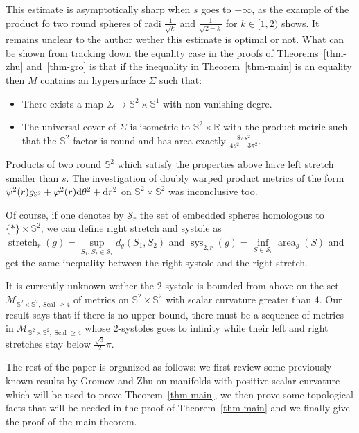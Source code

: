 \documentclass[10pt,a4paper]{amsart}
\numberwithin{equation}{section}
\DeclareMathOperator{\scal}{Scal}
\DeclareMathOperator{\aire}{area}
\DeclareMathOperator{\sys}{sys}
\DeclareMathOperator{\str}{stretch}
\newcommand{\ph}{\varphi}
\begin{document}
\begin{rem}
 This estimate is asymptotically sharp when $s$ goes to $+\infty$, as
 the example of the product fo two round spheres of radi
 $\frac{1}{\sqrt{k}}$ and $\frac{1}{\sqrt{2-k}}$ for $k\in[1,2)$
 shows. It remains unclear to the author wether this estimate is optimal or not. What can be shown from
 tracking down the equality case in the proofs of Theorems~\ref{thm-zhu} and~\ref{thm-gro} is that if the inequality in Theorem~\ref{thm-main} is an equality then $M$ contains an hypersurface
 $\Sigma$ such that:
 \begin{itemize}\itemsep=0pt
 \item There exists a map $\Sigma\to\mathbb{S}^2\times\mathbb{S}^1$
 with non-vanishing degre.
 \item The universal cover of $\Sigma$ is isometric to $\mathbb{S}^2\times\mathbb{R}$ with the product metric such that
 the $\mathbb{S}^2$ factor is round and has area exactly $\frac{8\pi s^2}{4s^2-3\pi^2}$.
 \end{itemize}
 Products of two round $\mathbb{S}^2$ which satisfy the properties
 above have left stretch smaller than $s$. The investigation of
 doubly warped product metrics of the form $\psi^2(r)g_{\mathbb{S}^2}+\ph^2(r){\rm d}\theta^2+ {\rm d}r^2$
 on $\mathbb{S}^2\times \mathbb{S}^2$ was inconclusive too.
\end{rem}
\begin{rem}
 Of course, if one denotes by $\mathcal{S}_r$ the set of embedded
 spheres homologous to \mbox{$\{\ast\}\times\mathbb{S}^2$}, we can define
 right stretch and systole as
 $\str_{r}(g)=\sup\limits_{S_1,S_2\in\mathcal{S}_r} d _g (S_1,S_2 )$
 and $\sys_{2,r}(g)\allowbreak =\inf\limits_{S\in\mathcal{S}_r}\aire_g(S)$ and get the
 same inequality between the right systole and the right stretch.
\end{rem}

It is currently unknown wether the $2$-systole is
bounded from above on the set
$\mathcal{M}_{\mathbb{S}^2\times\mathbb{S}^2,\scal\geq 4}$ of metrics on
$\mathbb{S}^2\times\mathbb{S}^2$ with scalar curvature greater than
$4$. Our result says that if there is no upper bound, there
must be a sequence of metrics in $\mathcal{M}_{\mathbb{S}^2\times\mathbb{S}^2,\scal\geq 4}$
whose $2$-systoles goes to infinity while their left and right
stretches stay below $\tfrac{\sqrt{3}}{2}\pi$.

The rest of the paper is organized as follows: we first review some
previously known results by Gromov and Zhu on manifolds with positive scalar curvature
which will be used to prove Theorem~\ref{thm-main}, we then prove some
topological facts that will be needed in the proof of Theorem~\ref{thm-main} and we finally give the proof of the main theorem.
\end{document}
